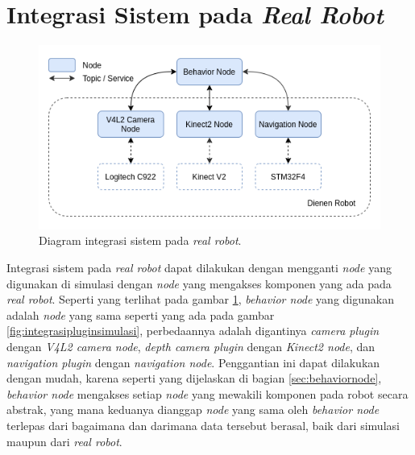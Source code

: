 \section{Integrasi Sistem pada \emph{Real Robot}}
\label{sec:integrasirobot}

\begin{figure}[ht]
  \centering
  \includegraphics[scale=0.55]{gambar/integrasi-real-robot.png}
  \caption{Diagram integrasi sistem pada \emph{real robot}.}
  \label{fig:integrasirealrobot}
\end{figure}

Integrasi sistem pada \emph{real robot} dapat dilakukan dengan mengganti \emph{node} yang digunakan di simulasi dengan \emph{node} yang mengakses komponen yang ada pada \emph{real robot}.
Seperti yang terlihat pada gambar \ref{fig:integrasirealrobot},
  \emph{behavior node} yang digunakan adalah \emph{node} yang sama seperti yang ada pada gambar \ref{fig:integrasipluginsimulasi},
  perbedaannya adalah digantinya \emph{camera plugin} dengan \emph{V4L2 camera node},
  \emph{depth camera plugin} dengan \emph{Kinect2 node},
  dan \emph{navigation plugin} dengan \emph{navigation node}.
Penggantian ini dapat dilakukan dengan mudah,
  karena seperti yang dijelaskan di bagian \ref{sec:behaviornode},
  \emph{behavior node} mengakses setiap \emph{node} yang mewakili komponen pada robot secara abstrak,
  yang mana keduanya dianggap \emph{node} yang sama oleh \emph{behavior node} terlepas dari bagaimana dan darimana data tersebut berasal,
  baik dari simulasi maupun dari \emph{real robot}.


